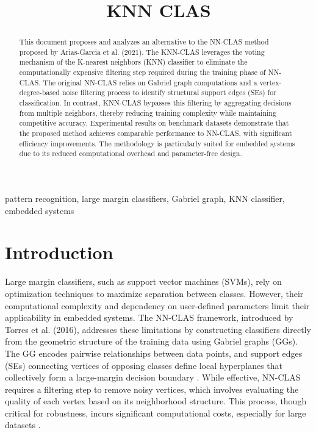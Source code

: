 \documentclass[conference]{IEEEtran}
\begin{document}
\title{KNN CLAS}

\author{
}

\maketitle

\begin{abstract}
This document proposes and analyzes an alternative to the NN-CLAS method proposed by Arias-Garcia et al. (2021). The KNN-CLAS leverages the voting mechanism of the K-nearest neighbors (KNN) classifier to eliminate the computationally expensive filtering step required during the training phase of NN-CLAS. The original NN-CLAS relies on Gabriel graph computations and a vertex-degree-based noise filtering process to identify structural support edges (SEs) for classification. In contrast, KNN-CLAS bypasses this filtering by aggregating decisions from multiple neighbors, thereby reducing training complexity while maintaining competitive accuracy. Experimental results on benchmark datasets demonstrate that the proposed method achieves comparable performance to NN-CLAS, with significant efficiency improvements. The methodology is particularly suited for embedded systems due to its reduced computational overhead and parameter-free design.
\end{abstract}

\begin{IEEEkeywords}
pattern recognition, large margin classifiers, Gabriel graph, KNN classifier, embedded systems
\end{IEEEkeywords}

\section{Introduction}

Large margin classifiers, such as support vector machines (SVMs), rely on optimization techniques to maximize separation between classes. However, their computational complexity and dependency on user-defined parameters limit their applicability in embedded systems. The NN-CLAS framework, introduced by Torres et al. (2016), addresses these limitations by constructing classifiers directly from the geometric structure of the training data using Gabriel graphs (GGs). The GG encodes pairwise relationships between data points, and support edges (SEs) connecting vertices of opposing classes define local hyperplanes that collectively form a large-margin decision boundary \cite{torres2016}. While effective, NN-CLAS requires a filtering step to remove noisy vertices, which involves evaluating the quality of each vertex based on its neighborhood structure. This process, though critical for robustness, incurs significant computational costs, especially for large datasets \cite{souza2019, arias2021}.
\end{document}
